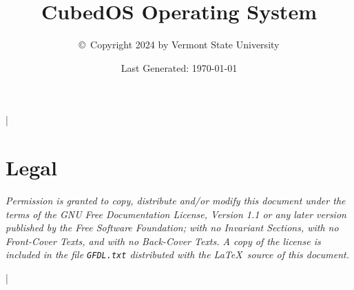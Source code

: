 \documentclass{scrreprt}
\begin{document}
\title{CubedOS Operating System}
\author{\copyright\ Copyright 2024 by Vermont State University}
\date{Last Generated: \today}
\maketitle

\tableofcontents

\lstMakeShortInline|

\section*{Legal}
\label{sec:legal}

\textit{Permission is granted to copy, distribute and/or modify this document under the terms of
the GNU Free Documentation License, Version 1.1 or any later version published by the Free
Software Foundation; with no Invariant Sections, with no Front-Cover Texts, and with no
Back-Cover Texts. A copy of the license is included in the file \texttt{GFDL.txt} distributed
with the \LaTeX\ source of this document.}






\newpage


\newpage


\lstDeleteShortInline|




\end{document}
